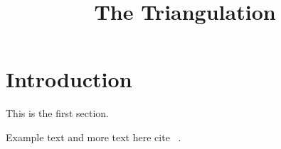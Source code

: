 \documentclass[a4paper]{article}
\begin{document}
	\sloppy
	\title{The Triangulation}
	
	\begin{titlepage}
		\maketitle
		\thispagestyle{empty}
	\end{titlepage}


	\tableofcontents
	\newpage
	\section{Introduction}
   
	This is the first section.
	
	Example text  and more text here
	cite ~\autocite{malhotra2010critical}.

	
	
	\newpage
	\printglossary[type=\acronymtype]
	\printglossary
	
	\newpage
	\printbibliography[heading=bibintoc]
	
	\newpage
	\listoftodos[Notes]
\end{document}
